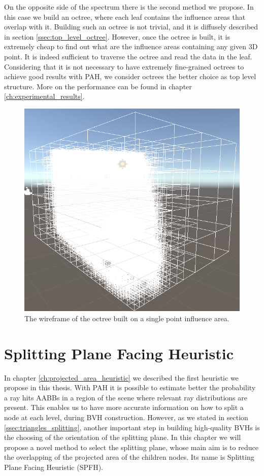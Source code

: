 \documentclass{PoliMi_MasterThesis}
\begin{document}
On the opposite side of the spectrum there is the second method we propose. In this case we build an octree, where each leaf contains the influence areas that overlap with it. Building such an octree is not trivial, and it is diffusely described in section \ref{ssec:top_level_octree}. However, once the octree is built, it is extremely cheap to find out what are the influence areas containing any given 3D point. It is indeed sufficient to traverse the octree and read the data in the leaf. Considering that it is not necessary to have extremely fine-grained octrees to achieve good results with PAH, we consider octrees the better choice as top level structure. More on the performance can be found in chapter \ref{ch:experimental_results}.

\begin{figure}[H]
    \centering
    \includegraphics[width=\textwidth]{Images/octree_dense_wireframe.png}
    \caption{The wireframe of the octree built on a single point influence area.}
    \label{fig:octree_dense_wireframe}
\end{figure}

\chapter{Splitting Plane Facing Heuristic} \label{ch:splitting_plane_facing_heuristic}
In chapter \ref{ch:projected_area_heuristic} we described the first heuristic we propose in this thesis. With PAH it is possible to estimate better the probability a ray hits AABBs in a region of the scene where relevant ray distributions are present. This enables us to have more accurate information on how to split a node at each level, during BVH construction. However, as we stated in section \ref{ssec:triangles_splitting}, another important step in building high-quality BVHs is the choosing of the orientation of the splitting plane. In this chapter we will propose a novel method to select the splitting plane, whose main aim is to reduce the overlapping of the projected area of the children nodes. Its name is Splitting Plane Facing Heuristic (SPFH).
\end{document}

